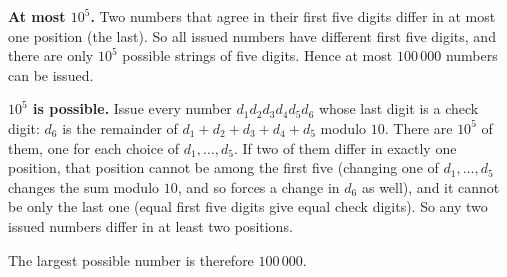 \textbf{At most $10^5$.} Two numbers that agree in their first five digits differ in at most one position (the last). So all issued numbers have different first five digits, and there are only $10^5$ possible strings of five digits. Hence at most $100\,000$ numbers can be issued.

\textbf{$10^5$ is possible.} Issue every number $d_1d_2d_3d_4d_5d_6$ whose last digit is a check digit: $d_6$ is the remainder of $d_1+d_2+d_3+d_4+d_5$ modulo $10$. There are $10^5$ of them, one for each choice of $d_1,\dots,d_5$. If two of them differ in exactly one position, that position cannot be among the first five (changing one of $d_1,\dots,d_5$ changes the sum modulo $10$, and so forces a change in $d_6$ as well), and it cannot be only the last one (equal first five digits give equal check digits). So any two issued numbers differ in at least two positions.

The largest possible number is therefore $\boxed{100\,000}$.
